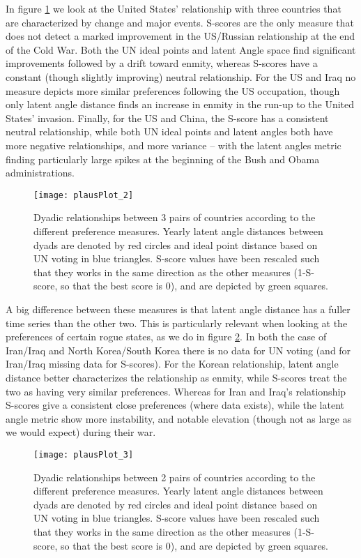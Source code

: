 In figure \ref{unfriendly:dyads} we look at the United States' relationship with three countries that are characterized by change and major events. S-scores are the only measure that does not detect a marked improvement in the US/Russian relationship at the end of the Cold War. Both the UN ideal points and latent Angle space find significant improvements followed by a drift toward enmity, whereas S-scores have a constant (though slightly improving) neutral relationship. For the US and Iraq no measure depicts more similar preferences following the US occupation, though only latent angle distance finds an increase in enmity in the run-up to the United States' invasion. Finally, for the US and China, the S-score has a consistent neutral relationship, while both UN ideal points and latent angles both have more negative relationships, and more variance -- with the latent angles metric finding particularly large spikes at the beginning of the Bush and Obama administrations.

\begin{figure}
	\centering
	\texttt{[image: plausPlot\_2]}
	\caption{Dyadic relationships between 3 pairs of countries according to the different preference measures. Yearly latent angle distances between dyads are denoted by red circles and ideal point distance based on UN voting in blue triangles. S-score values have been rescaled such that they works in the same direction as the other measures (1-S-score, so that the best score is 0), and are depicted by green squares.}
	\label{unfriendly:dyads}
\end{figure}

A big difference between these measures is that latent angle distance has a fuller time series than the other two. This is particularly relevant when looking at the preferences of certain rogue states, as we do in figure \ref{missing:dyads}. In both the case of Iran/Iraq and North Korea/South Korea there is no data for UN voting (and for Iran/Iraq missing data for S-scores). For the Korean relationship, latent angle distance better characterizes the relationship as enmity, while S-scores treat the two as having very similar preferences. Whereas for Iran and Iraq's relationship S-scores give a consistent close preferences (where data exists), while the latent angle metric show more instability, and notable elevation (though not as large as we would expect) during their war.


\begin{figure}
	\centering
	\texttt{[image: plausPlot\_3]}
	\caption{Dyadic relationships between 2 pairs of countries according to the different preference measures. Yearly latent angle distances between dyads are denoted by red circles and ideal point distance based on UN voting in blue triangles. S-score values have been rescaled such that they works in the same direction as the other measures (1-S-score, so that the best score is 0), and are depicted by green squares.}
	\label{missing:dyads}
\end{figure}


